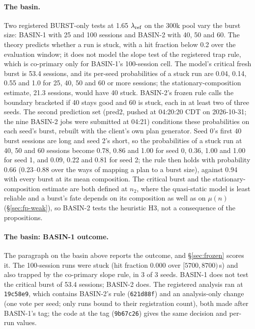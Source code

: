 \paragraph{The basin.} Two registered BURST-only tests at 1.65 $\lambda_{\mathrm{ref}}$ on the 300k pool vary the burst size: BASIN-1 with 25 and 100 sessions and BASIN-2 with 40, 50 and 60. The theory predicts whether a run is stuck, with a hit fraction below 0.2 over the evaluation window; it does not model the slope test of the registered trap rule, which is co-primary only for BASIN-1's 100-session cell. The model's critical fresh burst is 53.4 sessions, and its per-seed probabilities of a stuck run are 0.04, 0.14, 0.55 and 1.0 for 25, 40, 50 and 60 or more sessions; the stationary-composition estimate, 21.3 sessions, would have 40 stuck. BASIN-2's frozen rule calls the boundary bracketed if 40 stays good and 60 is stuck, each in at least two of three seeds. The second prediction set (pred2, pushed at 04:20:20 CDT on 2026-10-31; the nine BASIN-2 jobs were submitted at 04:21) conditions these probabilities on each seed's burst, rebuilt with the client's own plan generator. Seed 0's first 40 burst sessions are long and seed 2's short, so the probabilities of a stuck run at 40, 50 and 60 sessions become 0.78, 0.86 and 1.00 for seed 0, 0.36, 1.00 and 1.00 for seed 1, and 0.09, 0.22 and 0.81 for seed 2; the rule then holds with probability 0.66 (0.23--0.88 over the ways of mapping a plan to a burst size), against 0.94 with every burst at its mean composition. The critical burst and the stationary-composition estimate are both defined at $n_2$, where the quasi-static model is least reliable and a burst's fate depends on its composition as well as on $\mu(n)$ (\S\ref{sec:fp-weak}), so BASIN-2 tests the heuristic H3, not a consequence of the propositions.

\paragraph{The basin: BASIN-1 outcome.} The paragraph on the basin above reports the outcome, and \S\ref{sec:frozen} scores it. The 100-session runs were stuck (hit fraction 0.000 over $[5700,8700)$\,s) and also trapped by the co-primary slope rule, in 3 of 3 seeds. BASIN-1 does not test the critical burst of 53.4 sessions; BASIN-2 does. The registered analysis ran at \texttt{19c58e9}, which contains BASIN-2's rule (\texttt{621d88f}) and an analysis-only change (one vote per seed; only runs bound to their registration count), both made after BASIN-1's tag; the code at the tag (\texttt{9b67c26}) gives the same decision and per-run values.


